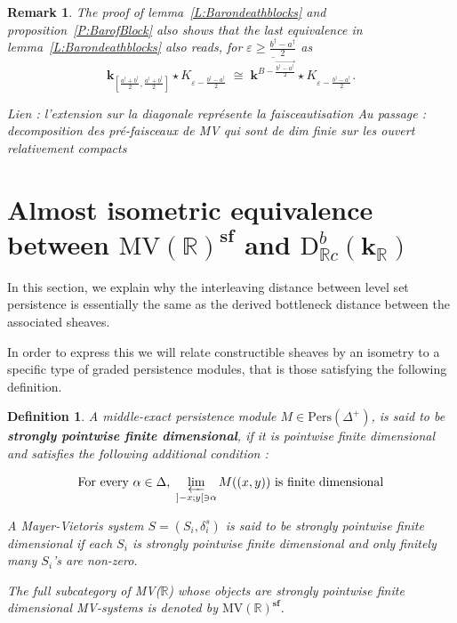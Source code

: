 \documentclass[a4paper, english, 11pt]{article}
\newcommand{\kk}[0]{\textbf{k}}
\newcommand{\0}{\vec{0}}
\newcommand{\R}[0]{\mathbb{R}}
\newcommand{\D}[0]{\text{D}}
\newcommand{\Pers}[0]{\text{Pers}}
\newcommand{\s}{\textbf{sf}}
\newtheorem{remark}[prop]{Remark}
\newtheorem{defi}[prop]{Definition}
\begin{document}
\begin{remark} The proof of lemma~\ref{L:Barondeathblocks} and proposition~\ref{P:BarofBlock} also shows that the last equivalence in lemma~\ref{L:Barondeathblocks} also reads, for $\varepsilon \geq \frac{b^\dagger-a^\dagger}{2}$ as
 \begin{equation}
  \kk_{[\frac{a^\dagger+b^\dagger}{2}, \frac{a^\dagger+b^\dagger}{2}]}\star K_{\varepsilon -\frac{b^\dagger -a^\dagger}{2}} \; \cong \; \overline{\kk^{B -\overrightarrow{\frac{b^\dagger-a^\dagger}{2}}}} \star  K_{\varepsilon -\frac{b^\dagger -a^\dagger}{2}}.
 \end{equation}

\end{remark}


\emph{
Lien : l'extension sur la diagonale représente la faisceautisation
Au passage : decomposition des pré-faisceaux de MV qui sont de dim finie sur les ouvert relativement compacts
}


\section{ Almost isometric equivalence between $\mbox{MV}(\R)^\s$ and $\D^b_{\R c}(\kk_\R)$}
In this section, we explain why the interleaving distance between level set persistence is essentially the same as the derived bottleneck distance between the associated sheaves.

In order to express this we will relate constructible sheaves by an isometry to a specific type of graded persistence modules, that is those satisfying the following definition.
\begin{defi}\label{D:spfd}
 A middle-exact persistence module $M\in \Pers(\Delta^+)$, is said to be \textbf{strongly pointwise finite dimensional}, if it is pointwise finite dimensional and satisfies the following additional condition : 

$$\text{For every $\alpha \in \Delta$,}~ \varprojlim_{]-x;y[\ni \alpha}M((x,y))  ~ \text{is finite dimensional} $$

A  Mayer-Vietoris system $S=(S_i,\delta^s_i)$ is said to be strongly pointwise finite dimensional if each $S_i$ is strongly pointwise finite dimensional  and only finitely many  $S_i$'s are non-zero.

The \emph{full subcategory of MV($\R$)} whose objects are \emph{strongly pointwise finite dimensional MV-systems is denoted by $\text{MV}(\R)^\s$}.
\end{defi}
\end{document}
